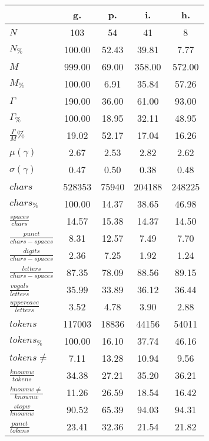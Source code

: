\begin{table}[h!]
\begin{center}
\begin{tabular}{| l || c | c | c | c |}\hline
 & {\bf g.} & {\bf p.} & {\bf i.} & {\bf h.} \\\hline\hline
$N$ & 103  & 54  & 41  & 8 \\
$N_{\%}$ & 100.00  & 52.43  & 39.81  & 7.77 \\\hline
$M$ & 999.00  & 69.00  & 358.00  & 572.00 \\
$M_{\%}$ & 100.00  & 6.91  & 35.84  & 57.26 \\\hline
$\Gamma$ & 190.00  & 36.00  & 61.00  & 93.00 \\
$\Gamma_{\%}$ & 100.00  & 18.95  & 32.11  & 48.95 \\\hline
$\frac{\Gamma}{M}\%$ & 19.02  & 52.17  & 17.04  & 16.26 \\
$\mu(\gamma)$ & 2.67  & 2.53  & 2.82  & 2.62 \\
$\sigma(\gamma)$ & 0.47  & 0.50  & 0.38  & 0.48 \\\hline\hline
$chars$ & 528353  & 75940  & 204188  & 248225 \\
$chars_{\%}$ & 100.00  & 14.37  & 38.65  & 46.98 \\\hline
$\frac{spaces}{chars}$ & 14.57  & 15.38  & 14.37  & 14.50 \\
$\frac{punct}{chars-spaces}$ & 8.31  & 12.57  & 7.49  & 7.70 \\
$\frac{digits}{chars-spaces}$ & 2.36  & 7.25  & 1.92  & 1.24 \\\hline
$\frac{letters}{chars-spaces}$ & 87.35  & 78.09  & 88.56  & 89.15 \\
$\frac{vogals}{letters}$ & 35.99  & 33.89  & 36.12  & 36.44 \\
$\frac{uppercase}{letters}$ & 3.52  & 4.78  & 3.90  & 2.88 \\\hline\hline
$tokens$ & 117003  & 18836  & 44156  & 54011 \\
$tokens_{\%}$ & 100.00  & 16.10  & 37.74  & 46.16 \\
$tokens \neq$ & 7.11  & 13.28  & 10.94  & 9.56 \\\hline
$\frac{knownw}{tokens}$ & 34.38  & 27.21  & 35.20  & 36.21 \\
$\frac{knownw \neq}{knownw}$ & 11.26  & 26.59  & 18.54  & 16.42 \\\hline
$\frac{stopw}{knownw}$ & 90.52  & 65.39  & 94.03  & 94.31 \\
$\frac{punct}{tokens}$ & 23.41  & 32.36  & 21.54  & 21.82 \\

\end{tabular}
\end{center}
\end{table}
